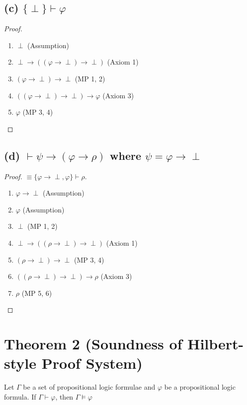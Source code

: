 \documentclass{article}
\begin{document}
\subsection*{(c) $\{\perp\} \vdash \varphi$}
\begin{proof}
    \begin{enumerate}
        \item $\perp$ (Assumption)
        \item $\perp \rightarrow ((\varphi \rightarrow \perp) \rightarrow \perp)$ (Axiom 1)
        \item $(\varphi \rightarrow \perp) \rightarrow \perp$ (MP 1, 2)
        \item $((\varphi \rightarrow \perp) \rightarrow \perp) \rightarrow \varphi$ (Axiom 3)
        \item $\varphi$ (MP 3, 4)
    \end{enumerate}
\end{proof}

\subsection*{(d) $\vdash \psi \rightarrow (\varphi \rightarrow \rho)$ where $\psi = \varphi \rightarrow \perp$}
\begin{proof}
    $\equiv \{\varphi \rightarrow \perp, \varphi\} \vdash \rho$.
    \begin{enumerate}
        \item $\varphi \rightarrow \perp$ (Assumption)
        \item $\varphi$ (Assumption)
        \item $\perp$ (MP 1, 2)
        \item $\perp \rightarrow ((\rho \rightarrow \perp) \rightarrow \perp)$ (Axiom 1)
        \item $(\rho \rightarrow \perp) \rightarrow \perp$ (MP 3, 4)
        \item $((\rho \rightarrow \perp) \rightarrow \perp) \rightarrow \rho$ (Axiom 3)
        \item $\rho$ (MP 5, 6)
    \end{enumerate}
\end{proof}

\section*{Theorem 2 (Soundness of Hilbert-style Proof System)}
Let $\Gamma$ be a set of propositional logic formulae and $\varphi$ be a propositional logic formula. If $\Gamma \vdash \varphi$, then $\Gamma \models \varphi$
\end{document}
